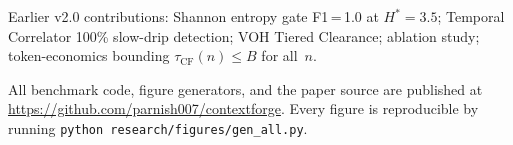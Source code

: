 \documentclass[11pt,twocolumn]{article}
\begin{document}
Earlier v2.0 contributions: Shannon entropy gate F1\,=\,1.0 at
$H^{*}\!=\!3.5$; Temporal Correlator 100\% slow-drip detection;
VOH Tiered Clearance; ablation study; token-economics bounding
$\tau_{\text{CF}}(n) \leq B$ for all~$n$.

All benchmark code, figure generators, and the paper source are published at
\url{https://github.com/parnish007/contextforge}.
Every figure is reproducible by running
\texttt{python research/figures/gen\_all.py}.

\balance


\end{document}
